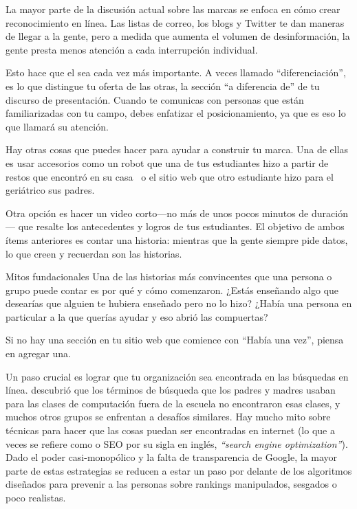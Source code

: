 La mayor parte de la discusión actual sobre las marcas se enfoca 
en cómo crear reconocimiento en línea.
Las listas de correo,
los blogs
y Twitter te dan maneras de llegar a la gente,
pero a medida que aumenta el volumen de desinformación,
la gente presta menos atención a cada interrupción individual.

Esto hace que el  sea cada vez más importante.
A veces llamado ``diferenciación'',
es lo que distingue tu oferta de las otras, la sección ``a diferencia de'' de tu discurso de presentación.
Cuando te comunicas con personas que están familiarizadas con tu campo,
debes enfatizar el  posicionamiento,
ya que es eso lo que  llamará su atención.

Hay otras cosas que puedes hacer para ayudar a construir tu marca.
Una de ellas es usar accesorios como un robot que una de tus estudiantes hizo a partir de restos que encontró en su casa~\cite{Schw2013}
o el sitio web que otro estudiante hizo para el geriátrico sus padres.

Otra opción es hacer un video corto---no más de unos pocos minutos de duración---
que resalte los antecedentes y logros de tus estudiantes.
El objetivo de ambos ítems anteriores es contar una historia:
mientras que la gente siempre pide datos,
lo que creen y recuerdan son las historias.

\begin{aside}{Mitos fundacionales}
Una de las historias más convincentes que una persona o grupo puede contar es
por qué y cómo comenzaron.
¿Estás enseñando algo que desearías que alguien te hubiera enseñado pero no lo hizo?
¿Había una persona en particular a la que querías ayudar
y eso abrió las compuertas?

Si no hay una sección en tu sitio web que comience con ``Había una vez'',
piensa en agregar una.
\end{aside}

Un paso crucial es lograr que tu organización sea encontrada en las búsquedas en línea. 
\cite{DiSa2014b} descubrió que
los términos de búsqueda que los padres y madres usaban para las clases de computación fuera de la escuela no encontraron esas clases, 
y muchos otros grupos se enfrentan a desafíos similares.
Hay mucho mito sobre técnicas para hacer que las cosas puedan ser encontradas en internet (lo que a veces se refiere como o SEO por su sigla en inglés, \emph{``search engine optimization''}). 
Dado el poder casi-monopólico y la falta de transparencia de Google,
la mayor parte de estas estrategias se reducen a estar un paso por delante de los
algoritmos diseñados para prevenir a las personas sobre rankings manipulados, sesgados o poco realistas.


